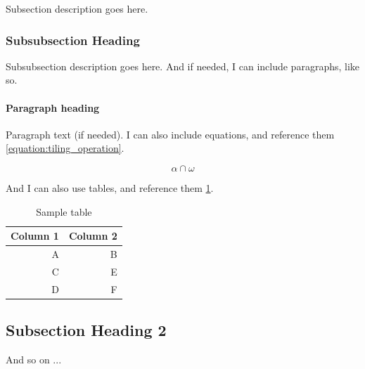 Subsection description goes here. 

\subsubsection{Subsubsection Heading}\label{subsubsection:subsubsection_name}

Subsubsection description goes here. And if needed, I can include paragraphs, like so. 

\paragraph{Paragraph heading}

Paragraph text (if needed). I can also include equations, and reference them \ref{equation:tiling_operation}.

\begin{equation}\label{equation:tiling_operation}
	\alpha \cap \omega
\end{equation}

And I can also use tables, and reference them \ref{table:sample_table}.

\begin{table}[]
	\begin{center}
		\begin{tabular}{r r } \hline \hline
			Column 1 & Column 2 \\
			\hline			
			A & B \\
			C & E \\
			D & F \\
		\end{tabular}
	\end{center}
	\caption{Sample table}
	\label{table:sample_table}
\end{table}


\subsection{Subsection Heading 2}\label{subsection:subsection_name_2}

And so on ... 